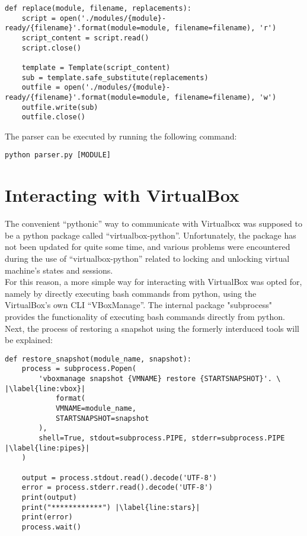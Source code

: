 \begin{lstlisting}[caption=Templaing, style=pythonstyle, label=templating]
def replace(module, filename, replacements):
    script = open('./modules/{module}-ready/{filename}'.format(module=module, filename=filename), 'r')
    script_content = script.read()
    script.close()

    template = Template(script_content)
    sub = template.safe_substitute(replacements)
    outfile = open('./modules/{module}-ready/{filename}'.format(module=module, filename=filename), 'w')
    outfile.write(sub)
    outfile.close()
\end{lstlisting}

The parser can be executed by running the following command:\\
\begin{lstlisting}[caption=Parser command, style=pythonstyle]
python parser.py [MODULE]
\end{lstlisting}


\section{Interacting with VirtualBox}
The convenient “pythonic” way to communicate with Virtualbox was supposed to be a python package called “virtualbox-python”\cite{sethmlarson}. Unfortunately, the package has not been updated for quite some time, and various problems were encountered during the use of “virtualbox-python” related to locking and unlocking virtual machine’s states and sessions.\\
For this reason, a more simple way for interacting with VirtualBox was opted for, namely by directly executing bash commands from python, using the VirtualBox’s own CLI “VBoxManage”\cite{vboxmanage}. The internal package "subprocess"\cite{subprocess} provides the functionality of executing bash commands directly from python.
Next, the process of restoring a snapshot using the formerly interduced tools will be explained:
\begin{lstlisting}[caption=Restore snapshot, style=pythonstyle, escapechar=|]
def restore_snapshot(module_name, snapshot):
    process = subprocess.Popen(
        'vboxmanage snapshot {VMNAME} restore {STARTSNAPSHOT}'. \ |\label{line:vbox}|
            format(
            VMNAME=module_name,
            STARTSNAPSHOT=snapshot
        ),
        shell=True, stdout=subprocess.PIPE, stderr=subprocess.PIPE |\label{line:pipes}|
    )

    output = process.stdout.read().decode('UTF-8')
    error = process.stderr.read().decode('UTF-8')
    print(output)
    print("************") |\label{line:stars}|
    print(error)
    process.wait()
\end{lstlisting}

